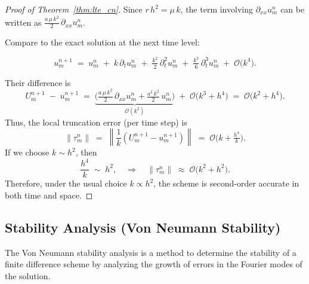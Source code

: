 \begin{proof}[Proof of Theorem~\ref{thm:lte_cn}]
  Since $r\,h^2 = \mu\,k$, the term involving $\partial_{xx} u_m^n$ can be written as
  $\tfrac{a\,\mu\,k^2}{2}\,\partial_{xx}u_m^n$.

  Compare to the exact solution at the next time level:

  \[
    u_m^{n+1}
    \;=\; u_m^n
    \;+\; k\,\partial_t u_m^n
    \;+\; \tfrac{k^2}{2}\,\partial_t^2 u_m^n
    \;+\; \tfrac{k^3}{6}\,\partial_t^3 u_m^n
    \;+\; \mathcal{O}\bigl(k^4\bigr).
  \]

  Their difference is
  \[
    U_m^{n+1} \;-\; u_m^{n+1}
    \;=\;
    \underbrace{\bigl(\tfrac{a\,\mu\,k^2}{2}\,\partial_{xx}u_m^n
      + \tfrac{a^2\,k^2}{2}\,u_m^n\bigr)}_{\mathcal{O}(k^2)}
    \;+\; \mathcal{O}\bigl(k^3 + h^4\bigr)
    \;=\; \mathcal{O}\bigl(k^2 + h^4\bigr).
  \]
  Thus, the local truncation error (per time step) is
  \[
    \lVert{\tau_m^n}\rVert
    \;=\; \left\lVert\dfrac{1}{k}\left(U_m^{n+1} - u_m^{n+1}\right) \right\rVert
    \;=\; \mathcal{O}\bigl(k + \tfrac{h^4}{k}\bigr).
  \]
  If we choose $k \sim h^2$, then
  \[
    \frac{h^4}{k} \;\sim\; h^2,
    \quad
    \Rightarrow
    \quad
    \lVert{\tau_m^n}\rVert \;\approx\; \mathcal{O}\bigl(k^2 + h^2\bigr).
  \]
  Therefore, under the usual choice $k \propto h^2$, the scheme is second-order accurate in both time and space.

\end{proof}

\subsection{Stability Analysis (Von Neumann Stability)}
The Von Neumann stability analysis is a method to determine the stability of a finite difference scheme by analyzing the growth of errors in the Fourier modes of the solution.

